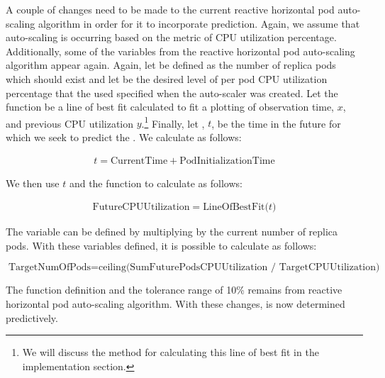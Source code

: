 A couple of changes need to be made to the current reactive horizontal pod
auto-scaling algorithm in order for it to incorporate prediction. Again, we
assume that auto-scaling is occurring based on the metric of
CPU utilization percentage. Additionally, some of the variables from the
reactive horizontal pod auto-scaling algorithm appear again. Again, let
 be defined as the number of replica pods which should
exist and let  be the desired level of per pod CPU
utilization percentage that the used specified when the auto-scaler was created.
Let the function  be a line of best fit calculated
to fit a plotting of observation time, $x$, and previous CPU utilization
$y$.\footnote{We will discuss the method for calculating this line of best fit
in the implementation section.} Finally, let
, $t$, be the time in the future for
which we seek to predict the . We calculate
 as follows:

\begin{align*}
  t = \mbox{CurrentTime} + \mbox{PodInitializationTime}
\end{align*}

We then use $t$ and the  function to
calculate  as follows:

\begin{align*}
  \mbox{FutureCPUUtilization} = \mbox{LineOfBestFit($t$)}
\end{align*}

The variable  can be defined by multiplying
 by the current number of replica pods.
With these variables defined, it is possible to calculate
 as follows:

\[ \mbox{TargetNumOfPods} = \mbox{ceiling(SumFuturePodsCPUUtilization /
TargetCPUUtilization)} \]

The  function definition and the tolerance range of 10\% remains from
reactive horizontal pod auto-scaling algorithm. With these changes,
 is now determined predictively.

